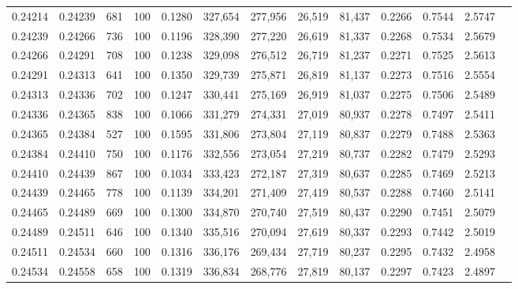 \begin{tabular}{rrrrrrrrrrrrr}
0.24214 & 0.24239 &   681 & 100 &                                     0.1280 & 327,654 & 277,956 &  26,519 &  81,437 & 0.2266 & 0.7544 & 2.5747 \\
0.24239 & 0.24266 &   736 & 100 &                                     0.1196 & 328,390 & 277,220 &  26,619 &  81,337 & 0.2268 & 0.7534 & 2.5679 \\
0.24266 & 0.24291 &   708 & 100 &                                     0.1238 & 329,098 & 276,512 &  26,719 &  81,237 & 0.2271 & 0.7525 & 2.5613 \\
0.24291 & 0.24313 &   641 & 100 &                                     0.1350 & 329,739 & 275,871 &  26,819 &  81,137 & 0.2273 & 0.7516 & 2.5554 \\
0.24313 & 0.24336 &   702 & 100 &                                     0.1247 & 330,441 & 275,169 &  26,919 &  81,037 & 0.2275 & 0.7506 & 2.5489 \\
0.24336 & 0.24365 &   838 & 100 &                                     0.1066 & 331,279 & 274,331 &  27,019 &  80,937 & 0.2278 & 0.7497 & 2.5411 \\
0.24365 & 0.24384 &   527 & 100 &                                     0.1595 & 331,806 & 273,804 &  27,119 &  80,837 & 0.2279 & 0.7488 & 2.5363 \\
0.24384 & 0.24410 &   750 & 100 &                                     0.1176 & 332,556 & 273,054 &  27,219 &  80,737 & 0.2282 & 0.7479 & 2.5293 \\
0.24410 & 0.24439 &   867 & 100 &                                     0.1034 & 333,423 & 272,187 &  27,319 &  80,637 & 0.2285 & 0.7469 & 2.5213 \\
0.24439 & 0.24465 &   778 & 100 &                                     0.1139 & 334,201 & 271,409 &  27,419 &  80,537 & 0.2288 & 0.7460 & 2.5141 \\
0.24465 & 0.24489 &   669 & 100 &                                     0.1300 & 334,870 & 270,740 &  27,519 &  80,437 & 0.2290 & 0.7451 & 2.5079 \\
0.24489 & 0.24511 &   646 & 100 &                                     0.1340 & 335,516 & 270,094 &  27,619 &  80,337 & 0.2293 & 0.7442 & 2.5019 \\
0.24511 & 0.24534 &   660 & 100 &                                     0.1316 & 336,176 & 269,434 &  27,719 &  80,237 & 0.2295 & 0.7432 & 2.4958 \\
0.24534 & 0.24558 &   658 & 100 &                                     0.1319 & 336,834 & 268,776 &  27,819 &  80,137 & 0.2297 & 0.7423 & 2.4897 \\

\end{tabular}
